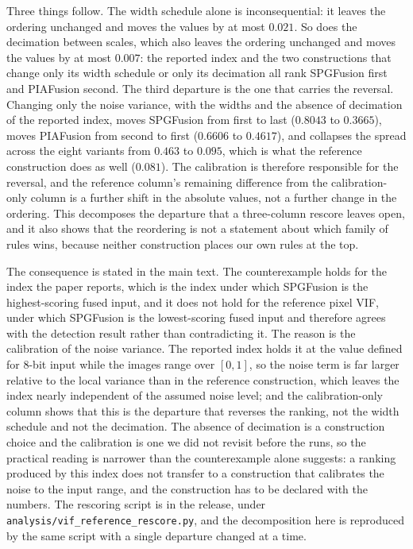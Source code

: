 \documentclass[preprint,12pt,a4paper]{elsarticle}
\begin{document}
Three things follow. The width schedule alone is inconsequential: it leaves the
ordering unchanged and moves the values by at most $0.021$. So does the decimation
between scales, which also leaves the ordering unchanged and moves the values by at
most $0.007$: the reported index and the two constructions that change only its width
schedule or only its decimation all rank SPGFusion first and PIAFusion second. The
third departure is the one that carries the reversal. Changing only the noise
variance, with the widths and the absence of decimation of the reported index, moves
SPGFusion from first to last ($0.8043$ to $0.3665$), moves PIAFusion from second to
first ($0.6606$ to $0.4617$), and collapses the spread across the eight variants from
$0.463$ to $0.095$, which is what the reference construction does as well ($0.081$).
The calibration is therefore responsible for the reversal, and the reference column's
remaining difference from the calibration-only column is a further shift in the
absolute values, not a further change in the ordering. This decomposes the departure
that a three-column rescore leaves open, and it also shows that the reordering is not
a statement about which family of rules wins, because neither construction places our
own rules at the top.

The consequence is stated in the main text. The counterexample holds for the index
the paper reports, which is the index under which SPGFusion is the highest-scoring
fused input, and it does not hold for the reference pixel VIF, under which SPGFusion
is the lowest-scoring fused input and therefore agrees with the detection result
rather than contradicting it. The reason is the calibration of the noise variance. The
reported index holds it at the value defined for 8-bit input while the images range
over $[0,1]$, so the noise term is far larger relative to the local variance than in
the reference construction, which leaves the index nearly independent of the assumed
noise level; and the calibration-only column shows that this is the departure that
reverses the ranking, not the width schedule and not the decimation. The absence of
decimation is a construction choice and the calibration is one we did not revisit
before the runs, so the practical reading is narrower than the counterexample alone
suggests: a ranking produced by this index does not transfer to a construction that
calibrates the noise to the input range, and the construction has to be declared with
the numbers. The rescoring script is in the release, under
\texttt{analysis/vif\_reference\_rescore.py}, and the decomposition here is reproduced
by the same script with a single departure changed at a time.
\end{document}
